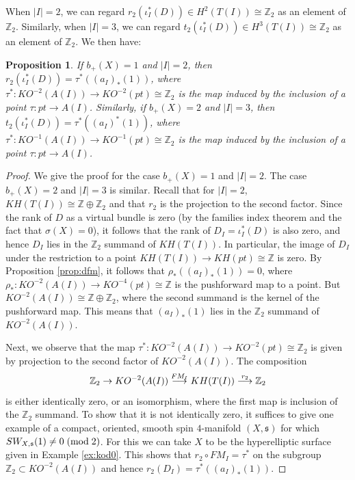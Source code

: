 \documentclass{amsart}
\newtheorem{proposition}[theorem]{Proposition}
\theoremstyle{definition}
\theoremstyle{remark}
\numberwithin{equation}{section}
\begin{document}
When $|I|=2$, we can regard $r_2( \iota_I^*(D) ) \in H^2( T(I) ) \cong \mathbb{Z}_2$ as an element of $\mathbb{Z}_2$. Similarly, when $|I|=3$, we can regard $t_2( \iota_I^*(D) ) \in H^3( T(I) ) \cong \mathbb{Z}_2$ as an element of $\mathbb{Z}_2$. We then have:

\begin{proposition}\label{prop:pullback}
If $b_+(X) = 1$ and $|I|=2$, then $r_2( \iota_I^*(D) ) = \tau^*( (a_I)_*(1) )$, where $\tau^* : KO^{-2}(A(I)) \to KO^{-2}(pt) \cong \mathbb{Z}_2$ is the map induced by the inclusion of a point $\tau : pt \to A(I)$. Similarly, if $b_+(X)=2$ and $|I|=3$, then $t_2( \iota_I^*(D) ) = \tau^*( (a_I)^*(1) )$, where $\tau^* : KO^{-1}(A(I)) \to KO^{-1}(pt) \cong \mathbb{Z}_2$ is the map induced by the inclusion of a point $\tau : pt \to A(I)$.
\end{proposition}
\begin{proof}
We give the proof for the case $b_+(X)=1$ and $|I|=2$. The case $b_+(X)=2$ and $|I|=3$ is similar. Recall that for $|I|=2$, $KH(T(I) ) \cong \mathbb{Z} \oplus \mathbb{Z}_2$ and that $r_2$ is the projection to the second factor. Since the rank of $D$ as a virtual bundle is zero (by the families index theorem and the fact that $\sigma(X)=0$), it follows that the rank of $D_I = \iota_I^*(D)$ is also zero, and hence $D_I$ lies in the $\mathbb{Z}_2$ summand of $KH(T(I))$. In particular, the image of $D_I$ under the restriction to a point $KH(T(I)) \to KH(pt) \cong \mathbb{Z}$ is zero. By Proposition \ref{prop:dfm}, it follows that $\rho_*( (a_I)_*(1) ) = 0$, where $\rho_* : KO^{-2}(A(I)) \to KO^{-4}(pt) \cong \mathbb{Z}$ is the pushforward map to a point. But $KO^{-2}(A(I)) \cong \mathbb{Z} \oplus \mathbb{Z}_2$, where the second summand is the kernel of the pushforward map. This means that $(a_I)_*(1)$ lies in the $\mathbb{Z}_2$ summand of $KO^{-2}(A(I))$.

Next, we observe that the map $\tau^* : KO^{-2}(A(I)) \to KO^{-2}(pt) \cong \mathbb{Z}_2$ is given by projection to the second factor of $KO^{-2}(A(I))$. The composition 
\[
\mathbb{Z}_2 \to KO^{-2}(A(I)) \buildrel FM_I \over \longrightarrow KH(T(I)) \buildrel r_2 \over \longrightarrow \mathbb{Z}_2
\]
is either identically zero, or an isomorphism, where the first map is inclusion of the $\mathbb{Z}_2$ summand. To show that it is not identically zero, it suffices to give one example of a compact, oriented, smooth spin $4$-manifold $(X,\mathfrak{s})$ for which $SW_{X,\mathfrak{s}}(1) \neq 0 \; ({\rm mod} \; 2)$. For this we can take $X$ to be the hyperelliptic surface given in Example \ref{ex:kod0}. This shows that $r_2 \circ FM_I = \tau^*$ on the subgroup $\mathbb{Z}_2 \subset KO^{-2}(A(I))$ and hence $r_2( D_I ) = \tau^*( (a_I)_*(1))$.
\end{proof}
\end{document}
